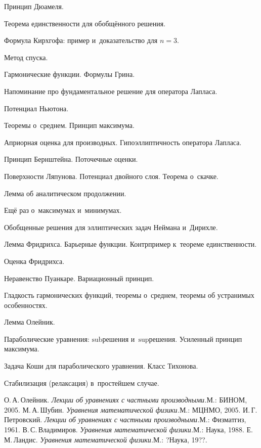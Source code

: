 \documentclass[a4paper]{article}
\begin{document}
\begin{items}{-3}
\item Принцип Дюамеля.
\item Теорема единственности для обобщённого решения.
\item Формула Кирхгофа: пример и~доказательство для $n=3$.
\item Метод спуска.
\item Гармонические функции. Формулы Грина.
\item Напоминание про фундаментальное решение для оператора Лапласа.
\item Потенциал Ньютона.
\item Теоремы о~среднем. Принцип максимума.
\item Априорная оценка для производных. Гипоэллиптичность оператора Лапласа.
\item Принцип Бернштейна. Поточечные оценки.
\item Поверхности Ляпунова. Потенциал двойного слоя. Теорема о~скачке.
\item Лемма об аналитическом продолжении.
\item Ещё раз о~максимумах и~минимумах.
\item Обобщенные решения для эллиптических задач Неймана и~Дирихле.
\item Лемма Фридрихса. Барьерные функции. Контрпример к~теореме единственности.
\item Оценка Фридрихса.
\item Неравенство Пуанкаре. Вариационный принцип.
\item Гладкость гармонических функций, теоремы о~среднем, теоремы
      об устранимых особенностях.
\item Лемма Олейник.
\item Параболические уравнения: $\mathrm{sub}$\д решения и~$\mathrm{sup}$\д решения.
      Усиленный принцип максимума.
\item Задача Коши для параболического уравнения. Класс Тихонова.
\item Стабилизация (релаксация) в~простейшем случае.
\end{items}

\begin{thebibliography}{5}
\setlength{\itemsep}{-3pt}
 О.\,А.\,Олейник. \emph{Лекции об уравнениях с частными производными.}\т М.: БИНОМ, 2005.
 М.\,А.\,Шубин. \emph{Уравнения математической физики.}\т М.: МЦНМО, 2005.
 И.\,Г.\,Петровский. \emph{Лекции об уравнениях с частными производными.}\т М.: Физматгиз, 1961.
 В.\,С.\,Владимиров. \emph{Уравнения математической физики.}\т М.: Наука, 1988.
 Е.\,М.\,Ландис. \emph{Уравнения математической физики.}\т М.: ?Наука, 19??.
\end{thebibliography}
\end{document}
